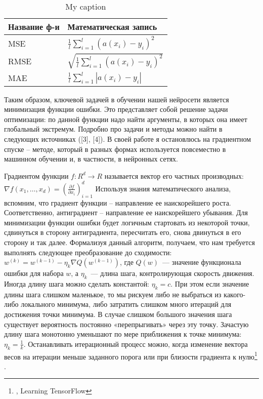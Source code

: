 \documentclass[12pt, a4paper]{article}
\begin{document}
\begin{table}[]
\centering
\caption{My caption}
\label{my-label}
\begin{tabular}{|l|l|}
\hline
Название  ф-и & Математическая запись                             \\ \hline
\rule{0cm}{0.8cm}
MSE           & $\frac{1}{l}\sum_{i=1}^{l}(a(x_i) - y_i)^2$       \\ \hline
\rule{0cm}{0.8cm}
RMSE          & $\sqrt{\frac{1}{l}\sum_{i=1}^{l}(a(x_i) - y_i)^2}$ \\ \hline
\rule{0cm}{0.8cm}
MAE           & $\frac{1}{l}\sum_{i=1}^{l}|a(x_i) - y_i|$         \\ \hline
\end{tabular}
\end{table}

Таким образом, ключевой задачей в обучении нашей нейросети является минимизация функции ошибки. Это представляет собой решение задачи оптимизации: по данной функции надо найти аргументы, в которых она имеет глобальный экстремум. Подробно про задачи и методы можно найти в следующих источниках ([3], [4]). В своей работе я остановлюсь на градиентном спуске – методе, который в разных формах используется повсеместно в машинном обучении и, в частности, в нейронных сетях.

Градиентом функции $f : R^d \to R$ называется вектор его частных производных:
$\nabla f(x_1, …, x_d) = (\frac{\partial f}{\partial x_i})_{i=1}^d$
Используя знания математического анализа, вспомним, что градиент функции – направление ее наискорейшего роста. Соответственно, антиградиент – направление ее наискорейшего убывания. Для минимизации функции ошибки будет логичным стартовать из некоторой точки, сдвинуться в сторону антиградиента, пересчитать его, снова двинуться в его сторону и так далее. Формализуя данный алгоритм, получаем, что нам требуется выполнять следующее преобразование до сходимости:
$w^{(k)} = w^{(k-1)} - \eta_k\nabla Q(w^{(k-1)})$, где $Q(w)$~--- значение функционала ошибки для набора $w$, а $\eta_k$~--- длина шага, контролирующая скорость движения. Иногда длину шага можно сделать константой: $\eta_k = c$. При этом если значение длины шага слишком маленькое, то мы рискуем либо не выбраться из какого-либо локального минимума, либо затратить слишком много итераций для достижения точки минимума. В случае слишком большого значения шага существует вероятность постоянно «перепрыгивать» через эту точку. Зачастую длину шага монотонно уменьшают по мере приближения к точке минимума: $\eta_k = \frac{1}{k}$. Останавливать итерационный процесс можно, когда изменение вектора весов на итерации меньше заданного порога или при близости градиента к нулю\footnote{\cite{Learning}, Learning TensorFlow} .
\end{document}
